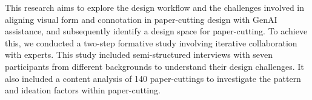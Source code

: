 This research aims to explore the design workflow and the challenges involved in aligning visual form and connotation in paper-cutting design with GenAI assistance, and subsequently identify a design space for paper-cutting. To achieve this, we conducted a two-step formative study involving iterative collaboration with experts. This study included semi-structured interviews with seven participants from different backgrounds to understand their design challenges. It also included a content analysis of 140 paper-cuttings to investigate the pattern and ideation factors within paper-cutting. 

